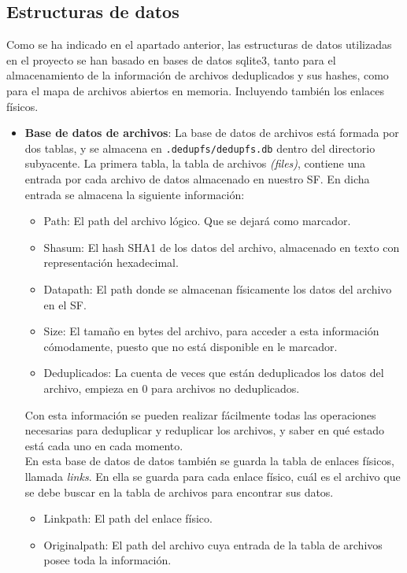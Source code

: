 \documentclass[12pt,a4paper]{article}
\begin{document}
\subsection{Estructuras de datos}

Como se ha indicado en el apartado anterior, las estructuras de datos utilizadas en el proyecto se han basado en bases de datos sqlite3, tanto para el almacenamiento de la información de archivos deduplicados y sus hashes, como para el mapa de archivos abiertos en memoria. Incluyendo también los enlaces físicos.

\begin{itemize}
 \item \textbf{Base de datos de archivos}: La base de datos de archivos está formada por dos tablas, y se almacena en \texttt{\small .dedupfs/dedupfs.db} dentro del directorio subyacente. La primera tabla, la tabla de archivos \emph{(files)}, contiene una entrada por cada archivo de datos almacenado en nuestro SF. En dicha entrada se almacena la siguiente información:
  \begin{itemize}
    \item Path: El path del archivo lógico. Que se dejará como marcador.
    \item Shasum: El hash SHA1 de los datos del archivo, almacenado en texto con representación hexadecimal.
    \item Datapath: El path donde se almacenan físicamente los datos del archivo en el SF.
    \item Size: El tamaño en bytes del archivo, para acceder a esta información cómodamente, puesto que no está disponible en le marcador.
    \item Deduplicados: La cuenta de veces que están deduplicados los datos del archivo, empieza en 0 para archivos no deduplicados.
  \end{itemize}
  Con esta información se pueden realizar fácilmente todas las operaciones necesarias para deduplicar y reduplicar los archivos, y saber en qué estado está cada uno en cada momento.\\
  
  En esta base de datos de datos también se guarda la tabla de enlaces físicos, llamada \emph{links}. En ella se guarda para cada enlace físico, cuál es el archivo que se debe buscar en la tabla de archivos para encontrar sus datos.
    \begin{itemize}
    \item Linkpath: El path del enlace físico.
    \item Originalpath: El path del archivo cuya entrada de la tabla de archivos posee toda la información.
  \end{itemize}
  

\end{itemize}
\end{document}

